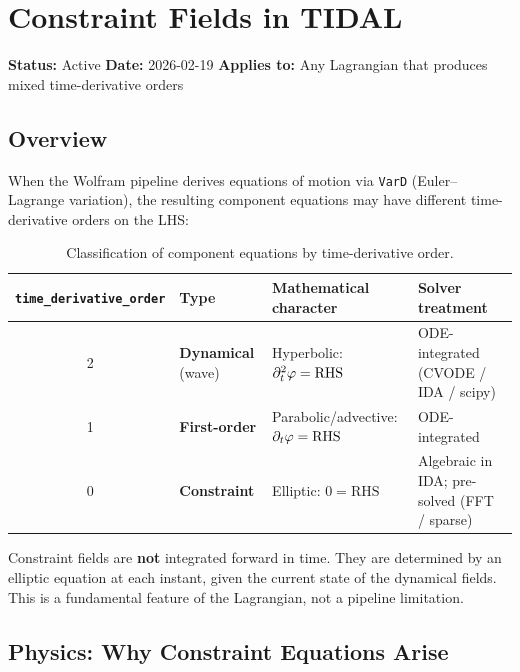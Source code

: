 
\section{Constraint Fields in TIDAL}
\label{sec:constraint-fields}

\textbf{Status:} Active \quad
\textbf{Date:} 2026-02-19 \quad
\textbf{Applies to:} Any Lagrangian that produces mixed time-derivative orders

\subsection{Overview}
\label{sec:cf-overview}

When the Wolfram pipeline derives equations of motion via \texttt{VarD} (Euler--Lagrange
variation), the resulting component equations may have different time-derivative
orders on the LHS:

\begin{table}[htbp]
\centering
\caption{Classification of component equations by time-derivative order.}
\label{tab:cf-classification}
\begin{tabular}{@{}clp{4cm}p{4.5cm}@{}}
\toprule
\texttt{time\_derivative\_order} & Type & Mathematical character & Solver treatment \\
\midrule
2 & \textbf{Dynamical} (wave) & Hyperbolic: $\partial_t^2 \varphi = \mathrm{RHS}$ & ODE-integrated (CVODE / IDA / scipy) \\
1 & \textbf{First-order} & Parabolic/advective: $\partial_t \varphi = \mathrm{RHS}$ & ODE-integrated \\
0 & \textbf{Constraint} & Elliptic: $0 = \mathrm{RHS}$ & Algebraic in IDA; pre-solved (FFT / sparse) \\
\bottomrule
\end{tabular}
\end{table}

Constraint fields are \textbf{not} integrated forward in time. They are determined
by an elliptic equation at each instant, given the current state of the
dynamical fields. This is a fundamental feature of the Lagrangian, not a
pipeline limitation.

\subsection{Physics: Why Constraint Equations Arise}
\label{sec:cf-physics}

